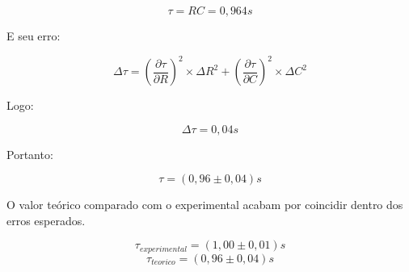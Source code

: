         $$\tau = RC = 0,964s$$

        E seu erro:

        $$\Delta\tau = (\frac{\partial\tau}{\partial R})^2 \times \Delta R^2
        + (\frac{\partial\tau}{\partial C})^2\times\Delta C^2$$

        Logo:

        $$\Delta\tau = 0,04s$$

        Portanto:

        $$\tau = (0,96 \pm 0,04)s$$

        O valor teórico comparado com o experimental acabam por coincidir 
        dentro dos erros esperados.
        
            $$\tau_{experimental} = (1,00 \pm 0,01)s$$
            $$\tau_{teorico} = (0,96 \pm 0,04)s$$